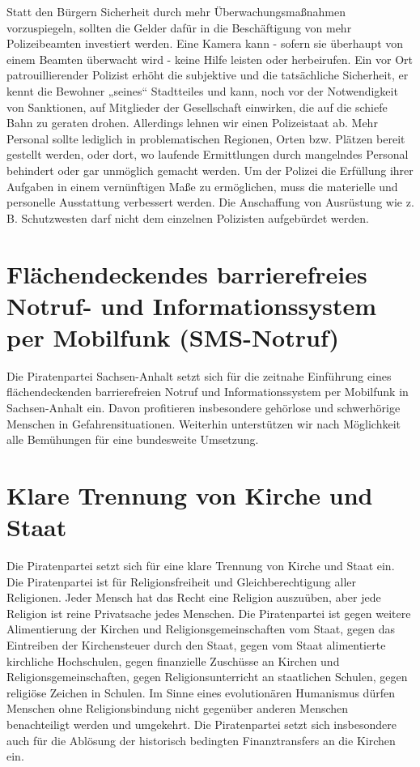 Statt den Bürgern Sicherheit durch mehr Überwachungsmaßnahmen vorzuspiegeln,
sollten die Gelder dafür in die Beschäftigung von mehr Polizeibeamten investiert
werden. Eine Kamera kann - sofern sie überhaupt von einem Beamten überwacht wird
- keine Hilfe leisten oder herbeirufen. Ein vor Ort patrouillierender Polizist
erhöht die subjektive und die tatsächliche Sicherheit, er kennt die Bewohner
„seines“ Stadtteiles und kann, noch vor der Notwendigkeit von Sanktionen, auf
Mitglieder der Gesellschaft einwirken, die auf die schiefe Bahn zu geraten
drohen.
Allerdings lehnen wir einen Polizeistaat ab. Mehr Personal sollte lediglich in
problematischen Regionen, Orten bzw. Plätzen bereit gestellt werden, oder dort,
wo laufende Ermittlungen durch mangelndes Personal behindert oder gar unmöglich
gemacht werden.
Um der Polizei die Erfüllung ihrer Aufgaben in einem vernünftigen Maße zu
ermöglichen, muss die materielle und personelle Ausstattung verbessert werden.
Die Anschaffung von Ausrüstung wie z. B. Schutzwesten darf nicht dem einzelnen
Polizisten aufgebürdet werden.

\section{Flächendeckendes barrierefreies Notruf- und Informationssystem per
Mobilfunk (SMS-Notruf)}

Die Piratenpartei Sachsen-Anhalt setzt sich für die zeitnahe Einführung eines
flächendeckenden barrierefreien Notruf und Informationssystem per Mobilfunk in
Sachsen-Anhalt ein. Davon profitieren insbesondere gehörlose und schwerhörige
Menschen in Gefahrensituationen. Weiterhin unterstützen wir nach Möglichkeit
alle Bemühungen für eine bundesweite Umsetzung.

\section{Klare Trennung von Kirche und Staat}

Die Piratenpartei setzt sich für eine klare Trennung von Kirche und Staat ein.
Die Piratenpartei ist für Religionsfreiheit und Gleichberechtigung aller
Religionen. Jeder Mensch hat das Recht eine Religion auszuüben, aber jede
Religion ist reine Privatsache jedes Menschen. Die Piratenpartei ist gegen
weitere Alimentierung der Kirchen und Religionsgemeinschaften vom Staat, gegen
das Eintreiben der Kirchensteuer durch den Staat, gegen vom Staat alimentierte
kirchliche Hochschulen, gegen finanzielle Zuschüsse an Kirchen und
Religionsgemeinschaften, gegen Religionsunterricht an staatlichen Schulen, gegen
religiöse Zeichen in Schulen. Im Sinne eines evolutionären Humanismus dürfen
Menschen ohne Religionsbindung nicht gegenüber anderen Menschen benachteiligt
werden und umgekehrt. Die Piratenpartei setzt sich insbesondere auch für die
Ablösung der historisch bedingten Finanztransfers an die Kirchen ein.

